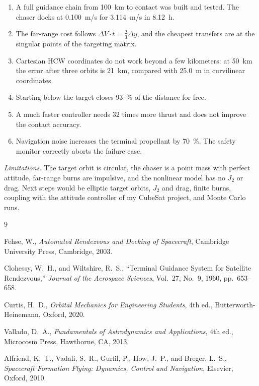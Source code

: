\documentclass[letterpaper,10pt]{article}
\begin{document}
\begin{enumerate}[leftmargin=2.2em,itemsep=0pt]
  \item A full guidance chain from \SI{100}{km} to contact was built and
        tested. The chaser docks at \SI{0.100}{m/s} for \SI{3.114}{m/s} in
        \SI{8.12}{h}.
  \item The far-range cost follows $\Delta V\cdot t = \tfrac23\Delta y$, and the
        cheapest transfers are at the singular points of the targeting matrix.
  \item Cartesian HCW coordinates do not work beyond a few kilometers: at
        \SI{50}{km} the error after three orbits is \SI{21}{km},
        compared with \SI{25.0}{m} in curvilinear coordinates.
  \item Starting below the target closes \SI{93}{\percent} of the distance for
        free.
  \item A much faster controller needs 32 times more thrust and
        does not improve the contact accuracy.
  \item Navigation noise increases the terminal propellant by
        \SI{70}{\percent}. The safety monitor correctly aborts the failure case.
\end{enumerate}

\textit{Limitations.} The target orbit is circular, the chaser is a point
mass with perfect attitude, far-range burns are impulsive, and the nonlinear
model has no $J_2$ or drag. Next steps would be elliptic target orbits,
$J_2$ and drag, finite burns, coupling with the attitude controller of my
CubeSat project, and Monte Carlo runs.

\begin{thebibliography}{9}
\setlength{\itemsep}{0pt}
\small

Fehse, W., \textit{Automated Rendezvous and Docking of Spacecraft},
Cambridge University Press, Cambridge, 2003.

Clohessy, W.~H., and Wiltshire, R.~S., ``Terminal Guidance System for
Satellite Rendezvous,'' \textit{Journal of the Aerospace Sciences}, Vol.~27,
No.~9, 1960, pp.~653--658.

Curtis, H.~D., \textit{Orbital Mechanics for Engineering Students}, 4th ed.,
Butterworth-Heinemann, Oxford, 2020.

Vallado, D.~A., \textit{Fundamentals of Astrodynamics and Applications},
4th ed., Microcosm Press, Hawthorne, CA, 2013.

Alfriend, K.~T., Vadali, S.~R., Gurfil, P., How, J.~P., and Breger, L.~S.,
\textit{Spacecraft Formation Flying: Dynamics, Control and Navigation},
Elsevier, Oxford, 2010.

\end{thebibliography}
\end{document}
